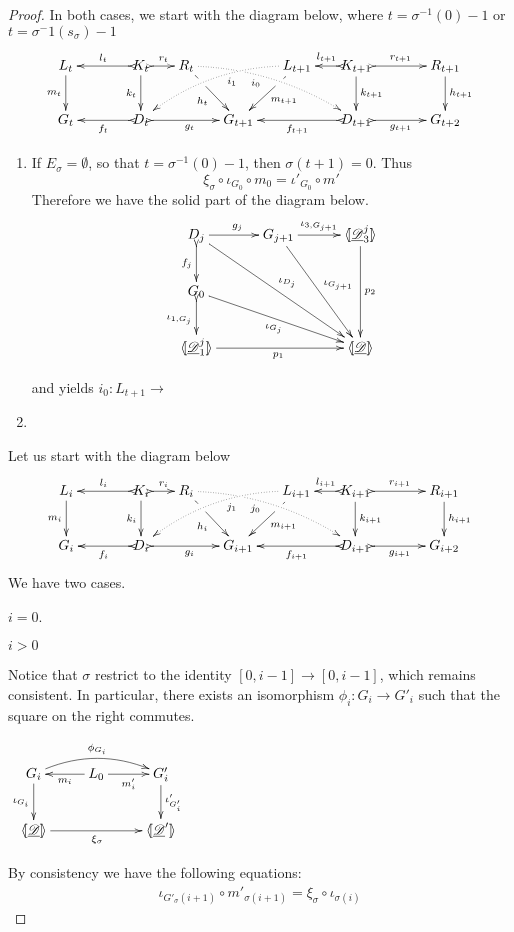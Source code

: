 \documentclass[a4paper,UKenglish,cleveref,pdftex,thm-restate,numberwithinsect,anonymous]{lipics}
\def\G{\textbf {\textup{G}}}
\newcommand{\dder}[1]{\mathscr{#1}}
\newcommand{\der}[1]{\underline{\dder{#1}}}
\newcommand{\lpro}{\langle \hspace{-1.85pt}[}
\newcommand{\rpro}{]\hspace{-1.85pt}\rangle}
\newcommand{\tpro}[1]{\lpro \der{#1}\rpro}
\begin{document}
\begin{proof}
	In both cases, we start with the diagram below, where $t=\sigma^{-1}(0)-1$ or $t=\sigma{^-1}(s_\sigma)-1$
	\[\xymatrix@C=15pt{L_t \ar[d]_{m_t}&& K_t
		\ar[d]_{k_t}\ar@{>->}[ll]_{l_t} \ar@{>->}[r]^{r_t} & R_t
		\ar@{.>}@/^.35cm/[drrr]|(.3)\hole_(.4){i_0}
		\ar[dr]|(.3)\hole_{h_t} && L_{t+1} \ar@{.>}@/_.4cm/[dlll]^(.4){i_1}
		\ar[dl]|(.3)\hole^{m_{t+1}}& K_{t+1} \ar[d]^{k_{t+1}}\ar@{>->}[l]_{l_{t+1}}
		\ar@{>->}[rr]^{r_{t+1}} && R_{t+1} \ar[d]^{h_{t+1}}\\G_t && \ar@{>->}[ll]^{f_t}
		D_t \ar@{>->}[rr]_{g_t}&& G_{t+1} && \ar@{>->}[ll]^{f_{t+1}} D_{t+1}\ar@{>->}[rr]_{g_{t+1}}&& G_{t+2}}\]
	
	
	\begin{enumerate}
		\item If $E_{\sigma}=\emptyset$, so that $t=\sigma^{-1}(0)-1$, then $\sigma(t+1)=0$. Thus
		\[\xi_\sigma\circ \iota_{G_0}\circ m_{0}=\iota'_{G_0}\circ m'_{}\]
		 Therefore we have the solid part of the diagram below. \[\xymatrix@C=30pt{D_{j} \ar[ddrr]^{\iota_{D_j}}
		 	\ar[r]^{g_j}\ar@{>->}[d]_{f_j}& G_{j+1}
		 	\ar[ddr]^{\iota_{G_{j+1}}}
		 	\ar[r]^-{\iota_{3, G_{j+1}}} & \lpro \der{D}^j_3\rpro \ar[dd]^{p_2} \\
		 	G_0\ar[drr]_{\iota_{G_{j}}} \ar@{>->}[d]_{\iota_{1,G_j}}\\ \lpro
		 	\der{D}^j_1 \rpro \ar[rr]_{p_1} &&\tpro{D} }\]
		 	
		 	and yields $i_0\colon L_{t+1}\to$
		\item 
	\end{enumerate}
	Let us start with the diagram below
	\[\xymatrix@C=15pt{L_i \ar[d]_{m_i}&& K_i
		\ar[d]_{k_i}\ar@{>->}[ll]_{l_i} \ar@{>->}[r]^{r_i} & R_i
		\ar@{.>}@/^.35cm/[drrr]|(.3)\hole_(.4){j_0}
		\ar[dr]|(.3)\hole_{h_i} && L_{i+1} \ar@{.>}@/_.4cm/[dlll]^(.4){j_1}
		\ar[dl]|(.3)\hole^{m_{i+1}}& K_{i+1} \ar[d]^{k_{i+1}}\ar@{>->}[l]_{l_{i+1}}
		\ar@{>->}[rr]^{r_{i+1}} && R_{i+1} \ar[d]^{h_{i+1}}\\G_i && \ar@{>->}[ll]^{f_i}
		D_i \ar@{>->}[rr]_{g_i}&& G_{i+1} && \ar@{>->}[ll]^{f_{i+1}} D_{i+1}\ar@{>->}[rr]_{g_{i+1}}&& G_{i+2}}\]
	We have two cases.
	
	\smallskip \noindent $i=0$. 
	
	
	\smallskip\noindent $i>0$
	
	
	\parbox{9cm}{Notice that $\sigma$ restrict to the identity $[0, i-1]\to [0,i-1]$, which remains consistent. In particular, there exists an isomorphism $\phi_{i}\colon G_i\to G'_i$ such that the square on the right commutes.}
	\parbox{3cm}{\vspace{-.5cm}$\xymatrix{G_i \ar[d]_{\iota_{G_i}}\ar@/^.4cm/[rr]^{\phi_{G_i}}& L_0  \ar[l]^{m_i}\ar[r]_{m'_{i}} & G'_{i} \ar[d]^{\iota'_{G'_i}}\\ \tpro{D} \ar[rr]_{\xi_\sigma} & &\lpro\der{D}'\rpro  }$}
	
	
	
	
	By consistency we have the following equations:
	\[\begin{split}
		\iota_{G'_\sigma(i+1)}\circ m'_{\sigma(i+1)} =\xi_{\sigma}\circ \iota_{\sigma(i)}
	\end{split}\]
\end{proof}
\end{document}
